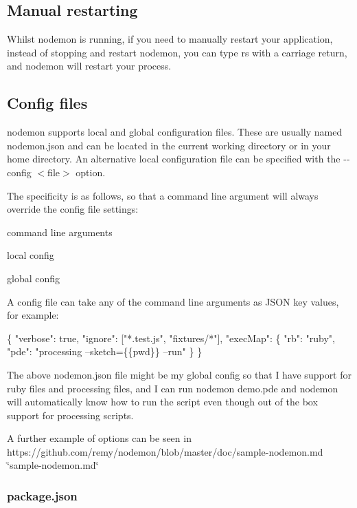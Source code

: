 \subsection*{Manual restarting}

Whilst nodemon is running, if you need to manually restart your application, instead of stopping and restart nodemon, you can type {\ttfamily rs} with a carriage return, and nodemon will restart your process.

\subsection*{Config files}

nodemon supports local and global configuration files. These are usually named {\ttfamily nodemon.\+json} and can be located in the current working directory or in your home directory. An alternative local configuration file can be specified with the {\ttfamily -\/-\/config $<$file$>$} option.

The specificity is as follows, so that a command line argument will always override the config file settings\+:


\begin{DoxyItemize}
\item command line arguments
\item local config
\item global config
\end{DoxyItemize}

A config file can take any of the command line arguments as J\+S\+ON key values, for example\+:


\begin{DoxyCode}
\{
  "verbose": true,
  "ignore": ["*.test.js", "fixtures/*"],
  "execMap": \{
    "rb": "ruby",
    "pde": "processing --sketch=\{\{pwd\}\} --run"
  \}
\}
\end{DoxyCode}


The above {\ttfamily nodemon.\+json} file might be my global config so that I have support for ruby files and processing files, and I can run {\ttfamily nodemon demo.\+pde} and nodemon will automatically know how to run the script even though out of the box support for processing scripts.

A further example of options can be seen in https\+://github.com/remy/nodemon/blob/master/doc/sample-\/nodemon.\+md \char`\"{}sample-\/nodemon.\+md\char`\"{}

\subsubsection*{package.\+json}

